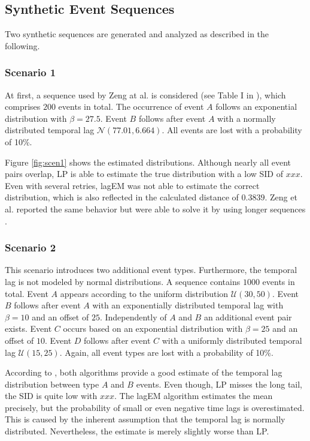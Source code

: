 \documentclass[journal, 10pt]{IEEEtran}
\begin{document}
\subsection{Synthetic Event Sequences}
\label{sec:results_synthetic}
%
Two synthetic sequences are generated and analyzed as described in the following.

\subsubsection{Scenario 1}
At first, a sequence used by Zeng at al. is considered (see Table I in \cite{Zeng2015}), which comprises $200$ events in total. The occurrence of event $A$ follows an exponential distribution with $\beta = 27.5$. Event $B$ follows after event $A$ with a normally distributed temporal lag $\mathcal{N}(77.01, 6.664)$. All events are lost with a probability of 10\%.

Figure \ref{fig:scen1} shows the estimated distributions. Although nearly all event pairs overlap, LP is able to estimate the true distribution with a low SID of $xxx$. Even with several retries, lagEM was not able to estimate the correct distribution, which is also reflected in the calculated distance of $0.3839$. Zeng et al. reported the same behavior but were able to solve it by using longer sequences \cite{Zeng2015}.


\subsubsection{Scenario 2}
This scenario introduces two additional event types. Furthermore, the temporal lag is not modeled by normal distributions. A sequence contains $1000$ events in total. Event $A$ appears according to the uniform distribution $\mathcal{U}(30, 50)$. Event $B$ follows after event $A$ with an exponentially distributed temporal lag with $\beta = 10$ and an offset of $25$. Independently of $A$ and $B$ an additional event pair exists. Event $C$ occurs based on an exponential distribution with $\beta = 25$ and an offset of $10$. Event $D$ follows after event $C$ with a uniformly distributed temporal lag $\mathcal{U}(15, 25)$. Again, all event types are lost with a probability of 10\%.

According to \Fig{}, both algorithms provide a good estimate of the temporal lag distribution between type $A$ and $B$ events.
Even though, LP misses the long tail, the SID is quite low with $xxx$. The lagEM algorithm estimates the mean precisely, but the probability of small or even negative time lags is overestimated. This is caused by the inherent assumption that the temporal lag is normally distributed. Nevertheless, the estimate is merely slightly worse than LP.
\end{document}
